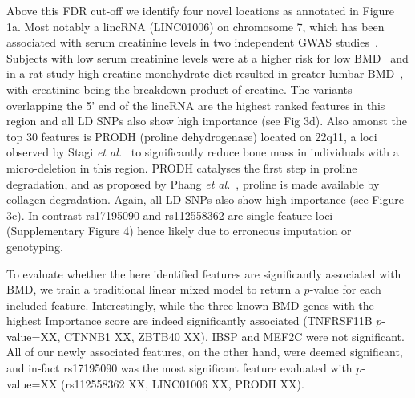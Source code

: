 \documentclass[10pt,letterpaper]{article}
\begin{document}
Above this FDR cut-off we identify four novel locations as annotated in Figure 1a.
Most notably a lincRNA (LINC01006) on chromosome 7, which has been associated with serum creatinine levels in two independent GWAS studies~\cite{Pattaro2010,Chambers2010}. 
Subjects with low serum creatinine levels were at a higher risk for low BMD~\cite{Huh2015} and in a rat study high creatine monohydrate diet resulted in greater lumbar BMD~\cite{Antolic2007}, 
with creatinine being the breakdown product of creatine. The variants overlapping the 5' end of the lincRNA are the highest ranked features in this region and all LD SNPs also show high importance (see Fig 3d). Also amonst the top 30 features is PRODH (proline dehydrogenase) located on 22q11, a loci observed by Stagi {\it
  et al.}~\cite{Stagi.2010} to significantly reduce bone mass in individuals with a micro-deletion in this region. 
PRODH catalyses the first step in proline degradation, and as proposed by Phang {\it et al.}~\cite{Phang.2008}, proline is made available by collagen degradation. 
Again, all LD SNPs also show high importance (see Figure 3c). %
In contrast rs17195090 and rs112558362 are single feature loci (Supplementary Figure 4) hence likely due to erroneous imputation or genotyping.

To evaluate whether the here identified features are significantly associated with BMD, we train a traditional linear mixed model to return a $p$-value for each included feature. Interestingly, while the three known BMD genes with the highest Importance score are indeed significantly associated (TNFRSF11B $p$-value=XX, CTNNB1 XX, ZBTB40 XX), IBSP and MEF2C were not significant. All of our newly associated features, on the other hand, were deemed significant, and in-fact rs17195090 was the most significant feature evaluated with $p$-value=XX (rs112558362 XX, LINC01006 XX, PRODH XX). 

\end{document}

